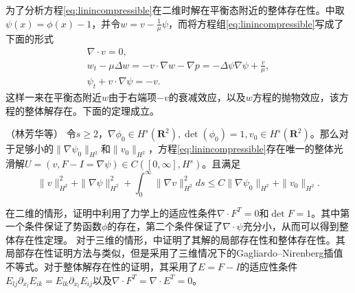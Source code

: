 为了分析方程\eqref{eq:linincompressible}在二维时解在平衡态附近的整体存在性。\cite{lin2005hydrodynamics}中取$\psi(x) = \phi(x)-1$，并令$w=v-\frac{1}{\mu}\psi$，而将方程组\eqref{eq:linincompressible}写成了下面的形式
\begin{eqnarray*}
	\nabla \cdot v =0 , \\
	w_t - \mu \Delta w = - v \cdot \nabla w - \nabla p = - \Delta \psi \nabla \psi + \frac{v}{\mu}, \\
	\psi_t + v \cdot \nabla \psi = -v.
\end{eqnarray*}
这样一来在平衡态附近$w$由于右端项$-v$的衰减效应，以及$w$方程的抛物效应，该方程的整体解存在。下面的定理成立。
\begin{theorem}（林芳华等\cite{lin2005hydrodynamics}）
	令$s \ge 2$，$\nabla \phi_0 \in H^s(\mathbf{R}^2),\det(\phi_0) = 1, v_0 \in H^s(\mathbf{R}^2)$。那么对于足够小的$\|\nabla \psi_0\|_{H^2}$和$\|v_0\|_{H^2}$，方程\eqref{eq:linincompressible}存在唯一的整体光滑解$U=(v,F-I=\nabla \psi) \in C([0,\infty],H^s)$。且满足
	\begin{equation*}
		\|v\|_{H^2}^2 +\|\nabla \psi\|_{H^2}^2 + \int_0^\infty \|\nabla v\|_{H^2}
^2ds \le C \|\nabla \psi_0\|_{H^2} + \|v_0\|_{H^2}.
	\end{equation*}
	\end{theorem}
	在二维的情形，证明中利用了力学上的适应性条件$\nabla \cdot F^T = 0$和$\det F =1$。其中第一个条件保证了势函数$\phi$的存在，第二个条件保证了$\nabla \cdot \psi$充分小，从而可以得到整体存在性定理。
对于三维的情形，\cite{lei2008global}中证明了其解的局部存在性和整体存在性。其局部存在性证明方法与\cite{lin2005hydrodynamics}类似，但是采用了三维情况下的Gagliardo–Nirenberg插值不等式。对于整体解存在性的证明，其采用了$E=F-I$的适应性条件$E_{lj}\partial_{x_l} E_{ik}=E_{lk}\partial_{x_l} E_{ij}$以及$\nabla \cdot F^T=\nabla \cdot E^T=0$。

